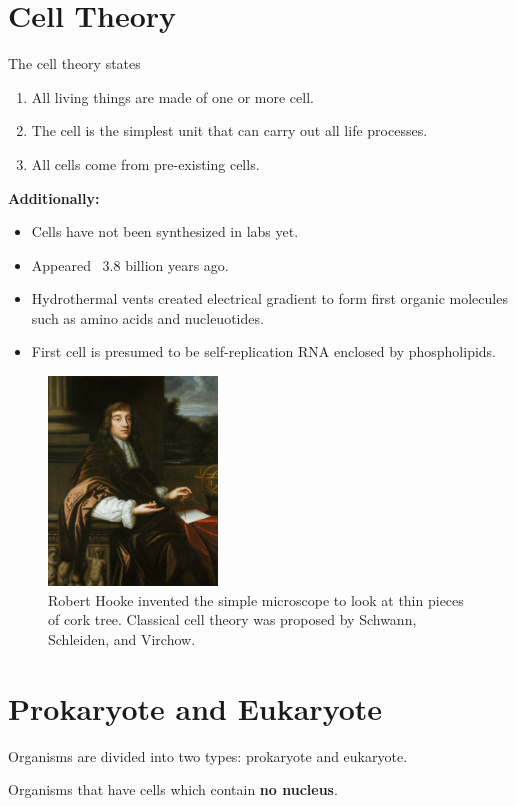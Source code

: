 \documentclass[12pt]{report}
\begin{document}
\section{Cell Theory}
\begin{definition}
    The cell theory states
    \begin{enumerate}
    \setlength\itemsep{0.5em}
        \item{All living things are made of one or more  cell.}
        \item{The cell is the simplest unit that can carry out all life processes.}
        \item{All cells come from pre-existing cells.}
    \end{enumerate}
\end{definition}

\textbf{Additionally:}
\begin{itemize}
    \item{Cells have not been synthesized in labs yet.}
    \item{Appeared ~3.8 billion years ago.}
    \item{Hydrothermal vents created electrical gradient to form first organic molecules such as amino acids and nucleuotides.}
    \item{First cell is presumed to be self-replication RNA enclosed by phospholipids.}
\end{itemize}

\begin{figure}[H]
\centering
    \includegraphics[width=0.4\textwidth]{../figures/robert hooke.jpg}
    \caption{Robert Hooke invented the simple microscope to look at thin pieces of cork tree. Classical cell theory was proposed by Schwann, Schleiden, and Virchow.}
\end{figure}

\section{Prokaryote and Eukaryote}
Organisms are divided into two types: prokaryote and eukaryote. 
\begin{definition}[Prokaryote]
    Organisms that have cells which contain \textbf{no nucleus}. 
\end{definition}
\end{document}
